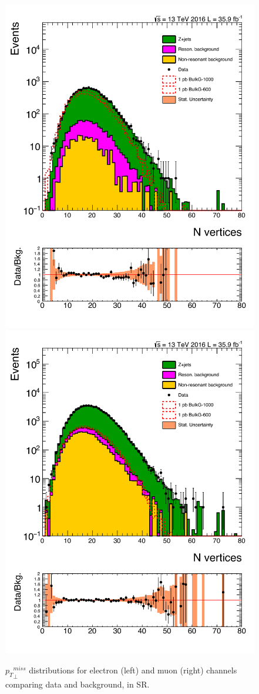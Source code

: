 \begin{figure}[htbp!]
\centering
\includegraphics[width=0.46\linewidth,page=23]{figures/ReMiniSummer16_DT_PhReMiniMCRcFixXsec_GMCPhPtWt_SRdPhiGT0p5_puWeightsummer16_muoneg_gjet_metfilter_unblind_el_log_1pb.pdf}
\includegraphics[width=0.46\linewidth,page=23]{figures/ReMiniSummer16_DT_PhReMiniMCRcFixXsec_GMCPhPtWt_SRdPhiGT0p5_puWeightsummer16_muoneg_gjet_metfilter_unblind_mu_log_1pb.pdf}
\caption{${p_{T}}^{miss}_\perp$ distributions for electron (left) and muon (right)
channels comparing data and background, in SR.}
\label{fig:SR_gjet_metperp}
\end{figure}

